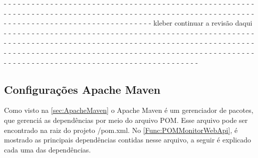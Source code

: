 - - - - - - - - - - - - - - - - - - - - - - - - - - - - - - - - - - - - - - - - - - - - - - - - - - - - - - - - - - - - 
- - - - - - - - - - - - - - - - - - - - - - - - - - - - - - - - - - - - - - - - - - - - - - - - - - - - - - - - - - - - 
- - - - - - - - - - - - - - - - - - - - kleber continuar a revisão daqui - - - - - - - - - - - - - - - - - - - - - - - -
- - - - - - - - - - - - - - - - - - - - - - - - - - - - - - - - - - - - - - - - - - - - - - - - - - - - - - - - - - - - 
- - - - - - - - - - - - - - - - - - - - - - - - - - - - - - - - - - - - - - - - - - - - - - - - - - - - - - - - - - - - 
- - - - - - - - - - - - - - - - - - - - - - - - - - - - - - - - - - - - - - - - - - - - - - - - - - - - - - - - - - - - 

\subsection{Configurações Apache Maven}\label{subsec:ConfiguraçõesApacheMaven}

Como visto na \autoref{sec:ApacheMaven} o Apache Maven é um gerenciador de pacotes, que gerenciá as dependências por meio do arquivo POM.
Esse arquivo pode ser encontrado na raiz do projeto /pom.xml.
No \autoref{Func:POMMonitorWebApi}, é mostrado as principais dependências contidas nesse arquivo, a seguir é explicado cada uma das dependências.

